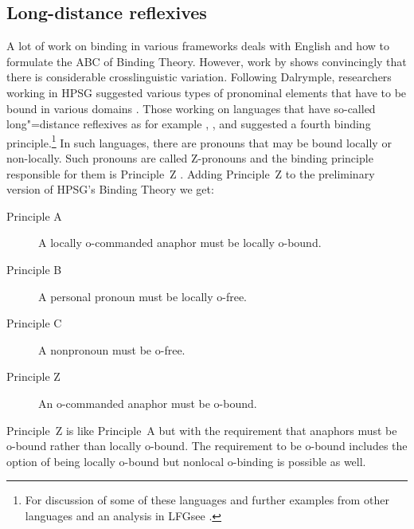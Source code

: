 \documentclass[output=paper
 	        ,biblatex
                ,babelshorthands
                ,newtxmath
                ,draftmode
                ,colorlinks, citecolor=brown
]{langscibook}
\begin{document}
\subsection{Long-distance reflexives}

A lot of work on binding in various frameworks deals with English and how to formulate the ABC of
Binding Theory. However, work by \citet{Dalrymple93a} shows convincingly that there is considerable
crosslinguistic variation. Following Dalrymple, researchers working in HPSG suggested various types of pronominal
elements that have to be bound in various domains \citep{AGS1998a,Koenig1999b,XPS94a-u,PX98a,BM99a,Dalrymple93a,Hellan2005a}.
Those working on languages that have so-called long"=distance
reflexives\label{page-long-distance-reflexives} as for example ,
, and 
\citep*{XPS94a-u,PX98a,BM99a,Dalrymple93a,Hellan2005a} suggested a fourth binding principle.\footnote{
For discussion of some of these languages and further examples from other languages and an analysis
in LFG\indexlfg see .
} In such languages, there are pronouns that  may be bound locally or non-locally.
Such pronouns are called Z-pronouns and the binding principle responsible for them is
Principle~Z \citep[]{BM99a}. Adding Principle~Z to the preliminary version of HPSG's
Binding Theory we get:
\begin{principle-break}
\begin{description}
\item [Principle A] A locally o-commanded anaphor must be locally o-bound.
\item [Principle B] A personal pronoun must be locally o-free.
\item [Principle C] A nonpronoun must be o-free.
\item [Principle Z] An o-commanded anaphor must be o-bound.
\end{description}
\end{principle-break}
Principle~Z is like Principle~A but with the requirement that anaphors must be o-bound rather than
locally o-bound. The requirement to be o-bound includes the option of being locally o-bound but
nonlocal o-binding is possible as well. 
\end{document}
